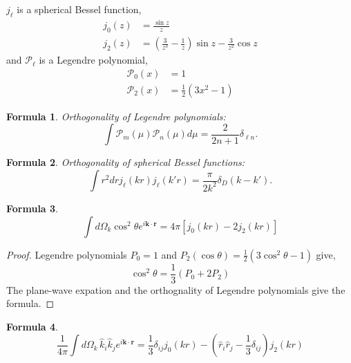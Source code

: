 \documentclass[a4paper,11pt]{article}
\newtheorem{formula}{Formula}[section]
\begin{document}
$j_\ell$ is a spherical Bessel function,
\begin{align}
  j_0(z) &= \frac{\sin z}{z}\\
  j_2(z) &= \left( \frac{3}{z^3} - \frac{1}{z} \right) \sin z
            - \frac{3}{z^2} \cos z
\end{align}
and $\mathcal{P}_\ell$ is a Legendre polynomial,
\begin{align}
  \mathcal{P}_0(x) &= 1\\
  \mathcal{P}_2(x) &= \frac{1}{2} (3 x^2 - 1)
\end{align}

\begin{formula}
  Orthogonality of Legendre polynomials:
  \begin{equation}
    \int \mathcal{P}_m(\mu) \mathcal{P}_n(\mu) d\mu =
    \frac{2}{2 n + 1} \delta_{\ell n}.
  \end{equation}
\end{formula}

\begin{formula}
  Orthogonality of spherical Bessel functions:
  \begin{equation}
    \int \! r^2 dr j_\ell(kr) j_\ell(k'r)
    = \frac{\pi}{2k^2} \delta_D(k - k').
  \end{equation}
\end{formula}

\begin{formula}
  \label{formula:cos2}
  \begin{equation}
    \int d\Omega_k \cos^2 \theta e^{i\bm{k}\cdot\bm{r}}
    =  4\pi \left[ j_0(kr) - 2 j_2(kr) \right]
  \end{equation}
\end{formula}

\begin{proof}
  Legendre polynomials $P_0 = 1$ and $P_2(\cos\theta) = \frac{1}{2} (3 \cos^2\theta - 1)$ give,
  \begin{equation}
    \cos^2 \theta = \frac{1}{3}( P_0 + 2P_2 )
  \end{equation}
  The plane-wave expation and the orthognality of Legendre polynomials give the formula.
\end{proof}

%
%
\begin{formula}
  \label{formula-moment}
  \begin{equation}
    \frac{1}{4\pi}\int d\Omega_k \, \hat{k}_i \hat{k}_j e^{i\bm{k}\cdot\bm{r}}
    = \frac{1}{3} \delta_{ij} j_0(kr) - \left(\hat{r}_i \hat{r}_j - \frac{1}{3} \delta_{ij} \right) j_2(kr)
  \end{equation}
\end{formula}
\end{document}
